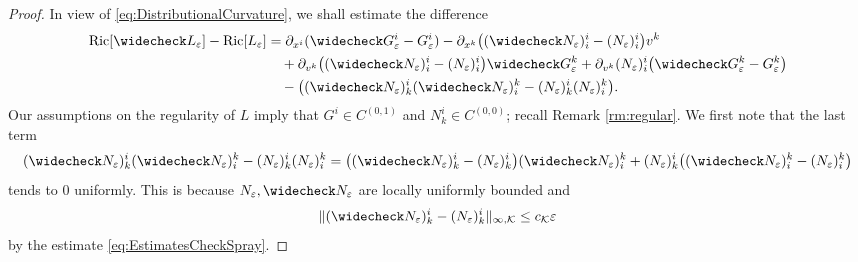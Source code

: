 \documentclass[a4paper,11pt]{article}
\numberwithin{equation}{section}
\theoremstyle{definition}
\theoremstyle{plain}
\newcommand{\eps}{\varepsilon}
\newcommand{\Ric}{\mathrm{Ric}}
\begin{document}
\begin{proof}
In view of \eqref{eq:DistributionalCurvature}, we shall estimate the difference
\begin{align*}
    \Ric[\widecheck L_\eps] - \Ric[L_\eps]
    &= \partial_{x^i}(\widecheck G_\eps^i-G_\eps^i)
    - \partial_{x^k}\bigl((\widecheck N_\eps)^i_{i}-( N_\eps)^i_{i}\bigr)v^k \\
    &\quad + \partial_{v^k}\bigl((\widecheck N_\eps)^i_{i}-(N_\eps)^i_{i}\bigr)\widecheck G_\eps^k 
    + \partial_{v^k}(N_\eps)^i_{i}\bigl(\widecheck G_\eps^k-G_\eps^k\bigr)\\
    &\quad - \bigl((\widecheck N_\eps)^i_{k}(\widecheck N_\eps)^k_{i}
    - (N_\eps)^i_{k}(N_\eps)^k_{i}\bigr).
\end{align*}
Our assumptions on the regularity of $L$ imply that $G^{i} \in C^{(0,1)}$ and $N^{i}_k \in C^{(0,0)}$; recall Remark \ref{rm:regular}. 
We first note that the last term 
\begin{equation*}
    (\widecheck N_\eps)^i_{k}(\widecheck N_\eps)^k_{i} 
    - (N_\eps)^i_{k}(N_\eps)^k_{i}
    = \bigl((\widecheck N_\eps)^i_{k}-(N_\eps)^i_{k}\bigr)(\widecheck N_\eps)^k_{i}
    + (N_\eps)^i_{k}\bigl((\widecheck N_\eps)^k_{i}-(N_\eps)^k_{i}\bigr)
\end{equation*}
tends to $0$ uniformly. 
This is because $N_\eps, \widecheck N_\eps$ are locally uniformly bounded and 
\begin{equation*}
    \|(\widecheck N_\eps)^i_k -(N_\eps)^i_k\|_{\infty,\mathcal{K}} \leq c_{\mathcal{K}}\eps
\end{equation*}
by the estimate \eqref{eq:EstimatesCheckSpray}. 


\end{proof}
\end{document}
